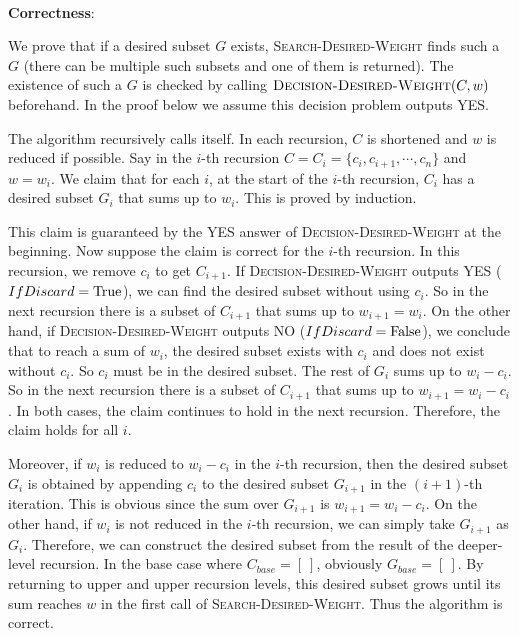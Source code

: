 \documentclass{article}
\begin{document}
~

\noindent\textbf{Correctness}:

We prove that if a desired subset $G$ exists, \textsc{Search-Desired-Weight} finds such a $G$ (there can be multiple such subsets and one of them is returned). The existence of such a $G$ is checked by calling $\textsc{Decision-Desired-Weight}(C,w)$ beforehand. In the proof below we assume this decision problem outputs YES.

The algorithm recursively calls itself. In each recursion, $C$ is shortened and $w$ is reduced if possible. Say in the $i$-th recursion $C=C_i=\{c_i,c_{i+1},\cdots,c_n\}$ and $w=w_i$. We claim that for each $i$, at the start of the $i$-th recursion, $C_i$ has a desired subset $G_i$ that sums up to $w_i$. This is proved by induction.

This claim is guaranteed by the YES answer of \textsc{Decision-Desired-Weight} at the beginning. Now suppose the claim is correct for the $i$-th recursion. In this recursion, we remove $c_i$ to get $C_{i+1}$. If \textsc{Decision-Desired-Weight} outputs YES ($IfDiscard=\textup{True}$), we can find the desired subset without using $c_i$. So in the next recursion there is a subset of $C_{i+1}$ that sums up to $w_{i+1}=w_i$. On the other hand, if \textsc{Decision-Desired-Weight} outputs NO ($IfDiscard=\textup{False}$), we conclude that to reach a sum of $w_i$, the desired subset exists with $c_i$ and does not exist without $c_i$. So $c_i$ must be in the desired subset. The rest of $G_i$ sums up to $w_i-c_i$. So in the next recursion there is a subset of $C_{i+1}$ that sums up to $w_{i+1}=w_i-c_i$. In both cases, the claim continues to hold in the next recursion. Therefore, the claim holds for all $i$.

Moreover, if $w_i$ is reduced to $w_i-c_i$ in the $i$-th recursion, then the desired subset $G_i$ is obtained by appending $c_i$ to the desired subset $G_{i+1}$ in the $(i+1)$-th iteration. This is obvious since the sum over $G_{i+1}$ is $w_{i+1}=w_i-c_i$. On the other hand, if $w_i$ is not reduced in the $i$-th recursion, we can simply take $G_{i+1}$ as $G_i$. Therefore, we can construct the desired subset from the result of the deeper-level recursion. In the base case where $C_{base}=[~]$, obviously $G_{base}=[~]$. By returning to upper and upper recursion levels, this desired subset grows until its sum reaches $w$ in the first call of \textsc{Search-Desired-Weight}. Thus the algorithm is correct.

~
\end{document}
